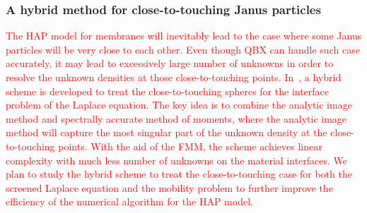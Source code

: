%

\subsubsection{A hybrid method for close-to-touching Janus particles}
\textcolor{red}{
The HAP model for membranes will inevitably lead to the case where some
Janus particles will be very close to each other. Even though QBX can
handle such case accurately, it may lead to excessively large number of
unknowns in order to resolve the unknown densities at those
close-to-touching points. In~\cite{gan2016sisc}, a hybrid scheme is
developed to treat the close-to-touching spheres for the interface
problem of the Laplace equation. The key idea is to combine the analytic
image method and spectrally accurate method of moments, where the
analytic image method will capture the most singular part of the unknown
density at the close-to-touching points. With the aid of the FMM, the
scheme achieves linear complexity with much less number of unknowns on
the material interfaces. We plan to study the hybrid scheme to treat
the close-to-touching case for both the screened Laplace equation and
the mobility problem to further improve the efficiency of the numerical
algorithm for the HAP model.
}


